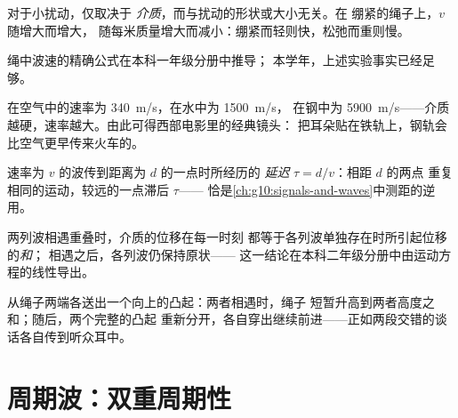 \begin{proposition}[介质决定速率]\label{prop:g12:mechanical-waves:medium}
对于小扰动，仅取决于
\emph{介质}，而与扰动的形状或大小无关。在
绷紧的绳子上，$v$ 随增大而增大，
随每米质量增大而减小：绷紧而轻则快，松弛而重则慢。\admitted
\end{proposition}

\begin{remark}[公式的出处]\label{rem:g12:mechanical-waves:ropeformula}
绳中波速的精确公式在本科一年级分册中推导；
本学年，上述实验事实已经足够。
\end{remark}

\begin{example}[声音的速率]\label{ex:g12:mechanical-waves:speeds}
在空气中的速率为 \qty{340}{m/s}，在水中为 \qty{1500}{m/s}，
在钢中为 \qty{5900}{m/s}——介质越硬，速率越大。由此可得西部电影里的经典镜头：
把耳朵贴在铁轨上，钢轨会比空气更早传来火车的。
\end{example}

\begin{definition}[延迟]\label{def:g12:mechanical-waves:delay}
速率为 $v$ 的波传到距离为 $d$ 的一点时所经历的
\emph{延迟} $\tau = d/v$：相距 $d$ 的两点
重复相同的运动，较远的一点滞后 $\tau$——
恰是\cref{ch:g10:signals-and-waves}中测距的逆用。
\end{definition}

\begin{proposition}[无相互作用的叠加]\label{prop:g12:mechanical-waves:superposition}
两列波相遇重叠时，介质的位移在每一时刻
都等于各列波单独存在时所引起位移的\emph{和}；
相遇之后，各列波仍保持原状——
这一结论在本科二年级分册中由运动方程的线性导出。\admitted
\end{proposition}

\begin{example}[相遇的脉冲]\label{ex:g12:mechanical-waves:crossing}
从绳子两端各送出一个向上的凸起：两者相遇时，绳子
短暂升高到两者高度之和；随后，两个完整的凸起
重新分开，各自穿出继续前进——正如两段交错的谈话各自传到听众耳中。
\end{example}

\section{周期波：双重周期性}

